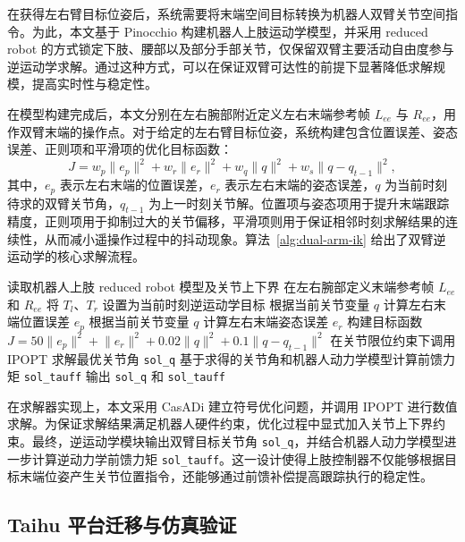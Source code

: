 在获得左右臂目标位姿后，系统需要将末端空间目标转换为机器人双臂关节空间指令。为此，本文基于 Pinocchio 构建机器人上肢运动学模型，并采用 reduced robot 的方式锁定下肢、腰部以及部分手部关节，仅保留双臂主要活动自由度参与逆运动学求解。通过这种方式，可以在保证双臂可达性的前提下显著降低求解规模，提高实时性与稳定性。

在模型构建完成后，本文分别在左右腕部附近定义左右末端参考帧 $L_{ee}$ 与 $R_{ee}$，用作双臂末端的操作点。对于给定的左右臂目标位姿，系统构建包含位置误差、姿态误差、正则项和平滑项的优化目标函数：
\begin{equation}
J = w_p \lVert e_p \rVert^2 + w_r \lVert e_r \rVert^2 + w_q \lVert q \rVert^2 + w_s \lVert q - q_{t-1} \rVert^2,
\end{equation}
其中，$e_p$ 表示左右末端的位置误差，$e_r$ 表示左右末端的姿态误差，$q$ 为当前时刻待求的双臂关节角，$q_{t-1}$ 为上一时刻关节解。位置项与姿态项用于提升末端跟踪精度，正则项用于抑制过大的关节偏移，平滑项则用于保证相邻时刻求解结果的连续性，从而减小遥操作过程中的抖动现象。算法~\ref{alg:dual-arm-ik} 给出了双臂逆运动学的核心求解流程。

\begin{algorithm}[ht]
  \caption{双臂逆运动学求解流程}
  \label{alg:dual-arm-ik}
  \SetAlgoLined

  读取机器人上肢 reduced robot 模型及关节上下界\;
  在左右腕部定义末端参考帧 $L_{ee}$ 和 $R_{ee}$\;
  将 $T_l$、$T_r$ 设置为当前时刻逆运动学目标\;
  根据当前关节变量 $q$ 计算左右末端位置误差 $e_p$\;
  根据当前关节变量 $q$ 计算左右末端姿态误差 $e_r$\;
  构建目标函数
  $
    J = 50 \lVert e_p \rVert^2 + \lVert e_r \rVert^2
    + 0.02 \lVert q \rVert^2 + 0.1 \lVert q - q_{t-1} \rVert^2
  $\;
  在关节限位约束下调用 IPOPT 求解最优关节角 \texttt{sol\_q}\;
  基于求得的关节角和机器人动力学模型计算前馈力矩 \texttt{sol\_tauff}\;
  输出 \texttt{sol\_q} 和 \texttt{sol\_tauff}\;
\end{algorithm}

在求解器实现上，本文采用 CasADi 建立符号优化问题，并调用 IPOPT 进行数值求解。为保证求解结果满足机器人硬件约束，优化过程中显式加入关节上下界约束。最终，逆运动学模块输出双臂目标关节角 \texttt{sol\_q}，并结合机器人动力学模型进一步计算逆动力学前馈力矩 \texttt{sol\_tauff}。这一设计使得上肢控制器不仅能够根据目标末端位姿产生关节位置指令，还能够通过前馈补偿提高跟踪执行的稳定性。

\subsection{Taihu 平台迁移与仿真验证}


